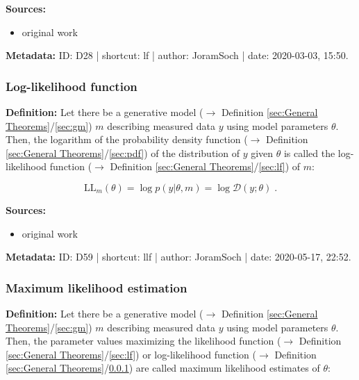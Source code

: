 \documentclass[a4paper,12pt,twoside]{book}
\begin{document}
\vspace{1em}
\textbf{Sources:}
\begin{itemize}
\item original work\end{itemize}


\vspace{1em}
\textbf{Metadata:} ID: D28 | shortcut: lf | author: JoramSoch | date: 2020-03-03, 15:50.
\vspace{1em}



\subsubsection[\textit{Log-likelihood function}]{Log-likelihood function} \label{sec:llf}
\setcounter{equation}{0}

\textbf{Definition:} Let there be a generative model ($\rightarrow$ Definition \ref{sec:General Theorems}/\ref{sec:gm}) $m$ describing measured data $y$ using model parameters $\theta$. Then, the logarithm of the probability density function ($\rightarrow$ Definition \ref{sec:General Theorems}/\ref{sec:pdf}) of the distribution of $y$ given $\theta$ is called the log-likelihood function ($\rightarrow$ Definition \ref{sec:General Theorems}/\ref{sec:lf}) of $m$:

\begin{equation} \label{eq:llf-llf}
\mathrm{LL}_m(\theta) = \log p(y|\theta,m) = \log \mathcal{D}(y; \theta) \; .
\end{equation}


\vspace{1em}
\textbf{Sources:}
\begin{itemize}
\item original work\end{itemize}


\vspace{1em}
\textbf{Metadata:} ID: D59 | shortcut: llf | author: JoramSoch | date: 2020-05-17, 22:52.
\vspace{1em}



\subsubsection[\textit{Maximum likelihood estimation}]{Maximum likelihood estimation} \label{sec:mle}
\setcounter{equation}{0}

\textbf{Definition:} Let there be a generative model ($\rightarrow$ Definition \ref{sec:General Theorems}/\ref{sec:gm}) $m$ describing measured data $y$ using model parameters $\theta$. Then, the parameter values maximizing the likelihood function ($\rightarrow$ Definition \ref{sec:General Theorems}/\ref{sec:lf}) or log-likelihood function ($\rightarrow$ Definition \ref{sec:General Theorems}/\ref{sec:llf}) are called maximum likelihood estimates of $\theta$:
\end{document}

